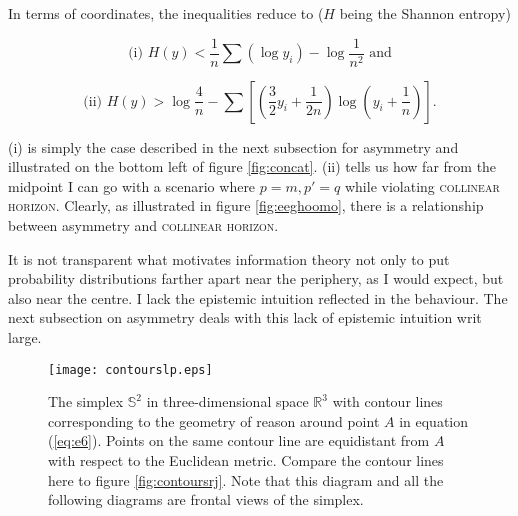 \documentclass[smallextended]{svjour3}       %
\begin{document}
In terms of coordinates, the inequalities reduce to ($H$ being the
Shannon entropy)

\begin{equation}
  \label{eq:iengaech}
\mbox{(i) }H(y)<\frac{1}{n}\sum\left(\log{}y_{i}\right)-\log\frac{1}{n^{2}}\mbox{ and}
\end{equation}

\begin{equation}
  \label{eq:feovaivo}
\mbox{(ii) }H(y)>\log\frac{4}{n}-\sum\left[\left(\frac{3}{2}y_{i}+\frac{1}{2n}\right)\log\left(y_{i}+\frac{1}{n}\right)\right].
\end{equation}

(i) is simply the case described in the next subsection for asymmetry
and illustrated on the bottom left of figure \ref{fig:concat}. (ii)
tells us how far from the midpoint I can go with a scenario where
$p=m,p'=q$ while violating \textsc{collinear horizon}. Clearly, as
illustrated in figure \ref{fig:eeghoomo}, there is a relationship
between asymmetry and \textsc{collinear horizon}. 

It is not transparent what motivates information theory not only to
put probability distributions farther apart near the periphery, as I
would expect, but also near the centre. I lack the epistemic intuition
reflected in the behaviour. The next subsection on asymmetry deals
with this lack of epistemic intuition writ large.

\begin{figure}[ht]
  \begin{flushright}
    \begin{minipage}[h]{.7\linewidth}
      \texttt{[image: contourslp.eps]}
      \caption{\footnotesize The simplex $\mathbb{S}^{2}$ in
        three-dimensional space $\mathbb{R}^{3}$ with contour lines
        corresponding to the geometry of reason around point $A$ in
        equation (\ref{eq:e6}). Points on the same contour line are
        equidistant from $A$ with respect to the Euclidean metric.
        Compare the contour lines here to figure
        \ref{fig:contoursrj}. Note that this diagram and all the
        following diagrams are frontal views of the simplex.}
      \label{fig:contourslp}
    \end{minipage}
  \end{flushright}
\end{figure}
\end{document}
